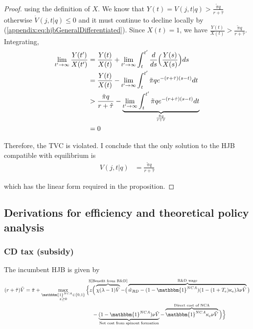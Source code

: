 \documentclass[11pt,english]{article}
\begin{document}
\begin{proof}
	using the definition of $X$. We know that $Y(t) = V(j,t|q) > \frac{\tilde{\pi} q}{r + \hat{\tau}}$ otherwise $\dot{V}(j,t|q) \le 0$ and it must continue to decline locally by (\ref{appendix:eq:hjbGeneralDifferentiated}). Since $X(t) = 1$, we have $\frac{Y(t)}{X(t)} > \frac{\tilde{\pi} q}{r + \hat{\tau}}$. Integrating, 
	\begin{align}
	\lim_{t' \to \infty} \frac{Y(t')}{X(t')} &=  \frac{Y(t)}{X(t)} + \lim_{t' \to \infty} \int_t^{t'} \frac{d}{ds} \Big(\frac{Y(s)}{X(s)} \Big) ds \\
	&= \frac{Y(t)}{X(t)} - \lim_{t' \to \infty} \int_t^{t'}  \tilde{\pi} q e^{-(r +\hat{\tau}) (s-t)} dt \\
	&> \frac{\tilde{\pi} q}{r + \hat{\tau}} - \underbrace{\lim_{t' \to \infty} \int_t^{t'}  \tilde{\pi} q e^{-(r +\hat{\tau}) (s-t)} dt}_{\mathclap{\frac{\tilde{\pi}q}{r + \hat{\tau}}}} \\ 
	&= 0
	\end{align}
	
	Therefore, the TVC is violated. I conclude that the only solution to the HJB compatible with equilibrium is 
	\begin{align}
	V(j,t|q) &= \frac{\tilde{\pi} q}{r + \hat{\tau}}
	\end{align}	
	
	which has the linear form required in the proposition.
	
\end{proof}

\subsection{Derivations for efficiency and theoretical policy analysis}

\subsubsection{CD tax (subsidy)}\label{appendix:model:efficiencyderivations:CDtax}

The incumbent HJB is given by 
\begin{align}
(r + \hat{\tau}) \tilde{V} = \tilde{\pi} + \max_{\substack{\mathbbm{1}^{NCA} \in \{0,1\} \\ z \ge 0}} \Big\{z &\Big( \overbrace{\chi (\lambda - 1) \tilde{V}}^{\mathclap{\mathbb{E}[\textrm{Benefit from R\&D}]}}-  \big( \overbrace{\hat{w}_{RD} - (1-\mathbbm{1}^{NCA})(1-(1+T_e)\kappa_e)\lambda \nu \tilde{V}}^{\mathclap{\text{R\&D wage}}}\big) \label{eq:hjb_incumbent_entryTax} \nonumber \\ 
&-  \underbrace{(1-\mathbbm{1}^{NCA}) \nu \tilde{V}}_{\mathclap{\text{Net cost from spinout formation}}} - \overbrace{\mathbbm{1}^{NCA} \kappa_{c} \nu \tilde{V}}^{\mathclap{\text{Direct cost of NCA}}}\Big) \Big\} 
\end{align}
\end{document}
